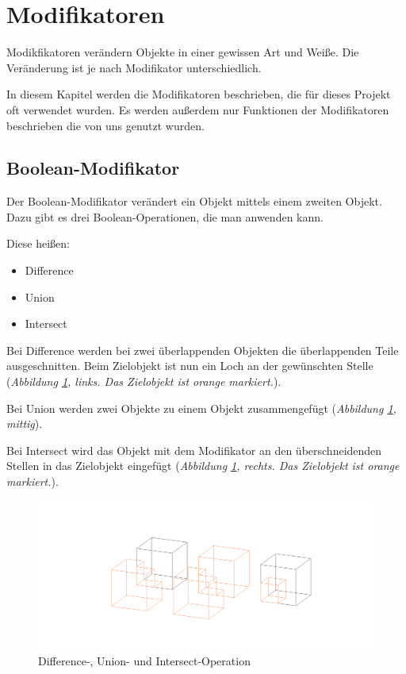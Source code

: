 \section{Modifikatoren}
Modikfikatoren verändern Objekte in einer gewissen Art und Weiße. Die Veränderung ist je nach Modifikator unterschiedlich.

In diesem Kapitel werden die Modifikatoren beschrieben, die für dieses Projekt oft verwendet wurden.
Es werden außerdem nur Funktionen der Modifikatoren beschrieben die von uns genutzt wurden.

\subsection{Boolean-Modifikator}
\label{Boolean:heading}
Der Boolean-Modifikator verändert ein Objekt mittels einem zweiten Objekt. Dazu gibt es
drei Boolean-Operationen, die man anwenden kann.\citep{blender:boolean_modifier}

Diese heißen:
\begin{itemize}
    \item  Difference
    \item  Union
    \item  Intersect
\end{itemize}

Bei Difference werden bei zwei überlappenden Objekten die überlappenden Teile ausgeschnitten. Beim Zielobjekt ist nun ein Loch an der gewünschten Stelle (\textit{Abbildung \ref{modifikatoren:image1}, links. Das Zielobjekt ist orange markiert.}).

Bei Union werden zwei Objekte zu einem Objekt zusammengefügt (\textit{Abbildung \ref{modifikatoren:image1}, mittig}).

Bei Intersect wird das Objekt mit dem Modifikator an den überschneidenden Stellen in das Zielobjekt eingefügt (\textit{Abbildung \ref{modifikatoren:image1}, rechts. Das Zielobjekt ist orange markiert.}).

\raggedbottom
\begin{figure}[H]
    \centering
    \includegraphics[width=.8\textwidth]{images/Modifikatoren-Boolean.png}
    \caption{Difference-, Union- und Intersect-Operation}
    \label{modifikatoren:image1}
\end{figure}

